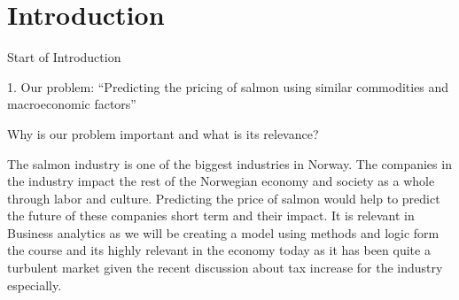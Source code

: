 \section{Introduction}

Start of Introduction

1. Our problem: “Predicting the pricing of salmon using similar commodities and macroeconomic factors” 
 
Why is our problem important and what is its relevance? 
  
The salmon industry is one of the biggest industries in Norway. The companies in the 	industry impact the rest of the Norwegian economy and society as a whole through labor and culture. Predicting the price of salmon would help to predict the future of these 	companies short term and their impact. 
It is relevant in Business analytics as we will be creating a model using methods and logic form the course and its highly relevant in the economy today as it has been quite a turbulent market given the recent discussion about tax increase for the industry especially.